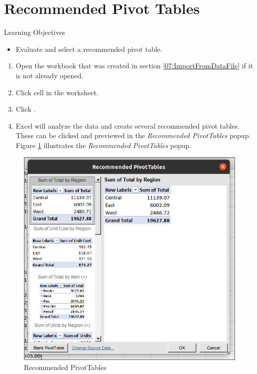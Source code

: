\section{Recommended Pivot Tables}

\begin{center}
	\begin{objbox}{Learning Objectives}
		\begin{itemize}
			\setlength{\itemsep}{0pt}
			\setlength{\parskip}{0pt}
			\setlength{\parsep}{0pt}
			
			\item Evaluate and select a recommended pivot table.
			
		\end{itemize}
	\end{objbox}
\end{center}

\begin{enumerate}
	\item Open the  workbook that was created in section \ref{07:ImportFromDataFile} if it is not already opened.
	\item Click cell  in the  worksheet.
	\item Click .
	\item Excel will analyze the data and create several recommended pivot tables. These can be clicked and previewed in the \textit{Recommended PivotTables} popup. Figure \ref{07:fig26} illustrates the \textit{Recommended PivotTables} popup.
\end{enumerate}

\begin{figure}[H]
	\centering
	\includegraphics[width=\maxwidth{.95\linewidth}]{gfx/ch07_fig26}
	\caption{Recommended PivotTables}
	\label{07:fig26}
\end{figure}

